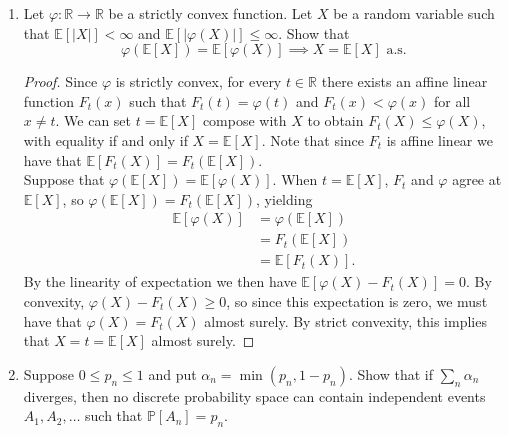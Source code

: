 \documentclass[11pt,letterpaper]{report}
\newcommand{\reals}{\mathbb{R}}
\newcommand{\E}{\mathbb{E}}
\newcommand{\Prob}{\mathbb{P}}
\begin{document}
\begin{enumerate}
	\item Let $\varphi:\reals\to \reals$ be a strictly convex function. Let $X$ be a random variable such that $\E[|X|]<\infty$ and $\E[|\varphi(X)|]\leq \infty$. Show that
	\[
	\varphi(\E[X]) = \E[\varphi(X)] \implies X = \E[X]\text{ a.s.}
	\]
	\begin{proof}
		Since $\varphi$ is strictly convex, for every $t\in \reals$ there exists an affine linear function $F_t(x)$ such that $F_t(t) = \varphi(t)$ and $F_t(x)<\varphi(x)$ for all $x\neq t$. We can set $t = \E[X]$ compose with $X$ to obtain $F_t(X)\leq\varphi(X)$, with equality if and only if $X = \E[X]$. Note that since $F_t$ is affine linear we have that $\E[F_t(X)] = F_t(\E[X])$.\\

		\noindent Suppose that $\varphi(\E[X]) = \E[\varphi(X)]$. When $t = \E[X]$, $F_t$ and $\varphi$ agree at $\E[X]$, so $\varphi(\E[X]) = F_t(\E[X])$, yielding
		\begin{align*}
			\E[\varphi(X)] &= \varphi(\E[X])\\
			&= F_t(\E[X])\\
			&= \E[F_t(X)].
		\end{align*}
		By the linearity of expectation we then have $\E[\varphi(X) - F_t(X)] = 0$. By convexity, $\varphi(X) - F_t(X)\geq 0$, so since this expectation is zero, we must have that $\varphi(X) = F_t(X)$ almost surely. By strict convexity, this implies that $X = t = \E[X]$ almost surely.
	\end{proof}

	\item Suppose $0\leq p_n\leq 1$ and put $\alpha_n = \min(p_n, 1-p_n)$. Show that if $\sum_n\alpha_n$ diverges, then no discrete probability space can contain independent events $A_1, A_2, \ldots$ such that $\Prob[A_n] = p_n$.
\end{enumerate}
\end{document}
